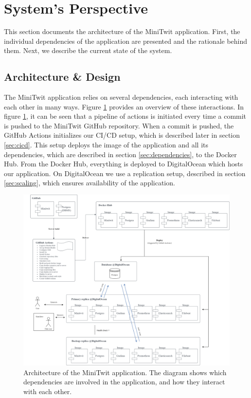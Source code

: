 \section{System's Perspective} \label{sec:system}
This section documents the architecture of the MiniTwit application. First, the individual dependencies of the application are presented and the rationale behind them. Next, we describe the current state of the system.

\subsection{Architecture \& Design}
The MiniTwit application relies on several dependencies, each interacting with each other in many ways. Figure \ref{fig:architecture} provides an overview of these interactions. In figure \ref{fig:architecture}, it can be seen that a pipeline of actions is initiated every time a commit is pushed to the MiniTwit GitHub repository. When a commit is pushed, the GitHub Actions initializes our CI/CD setup, which is described later in section \ref{sec:cicd}. This setup deploys the image of the application and all its dependencies, which are described in section \ref{sec:dependencies}, to the Docker Hub. From the Docker Hub, everything is deployed to DigitalOcean which hosts our application. On DigitalOcean we use a replication setup, described in section \ref{sec:scaling}, which ensures availability of the application.

\begin{figure}[H]
    \centering
    \includegraphics[width=\linewidth]{images/architecture.png}
    \caption{Architecture of the MiniTwit application. The diagram shows which dependencies are involved in the application, and how they interact with each other.}
    \label{fig:architecture}
\end{figure}

